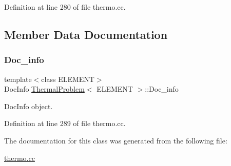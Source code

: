 Definition at line 280 of file thermo.\+cc.



\subsection{Member Data Documentation}
\mbox{\label{classThermalProblem_ae03e6df96a793f3735d1674e4e8a6cb3}} 
\subsubsection{\texorpdfstring{Doc\+\_\+info}{Doc\_info}}
{\footnotesize\ttfamily template$<$class E\+L\+E\+M\+E\+NT$>$ \\
Doc\+Info \hyperlink{classThermalProblem}{Thermal\+Problem}$<$ E\+L\+E\+M\+E\+NT $>$\+::Doc\+\_\+info\hspace{0.3cm}{\ttfamily [private]}}



Doc\+Info object. 



Definition at line 289 of file thermo.\+cc.



The documentation for this class was generated from the following file\+:\begin{DoxyCompactItemize}
\item 
\hyperlink{thermo_8cc}{thermo.\+cc}\end{DoxyCompactItemize}
